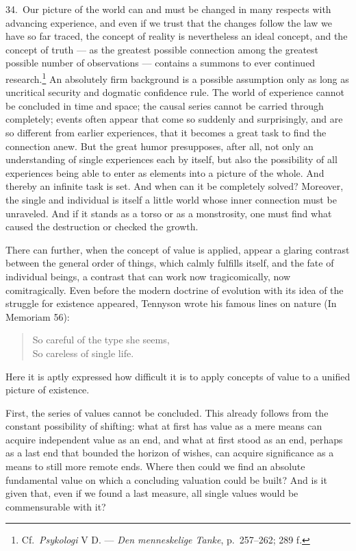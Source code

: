 \documentclass[12pt]{book}
\newcommand{\opage}[1]{\marginnote{\footnotesize\textit{[#1]}}}
\begin{document}
34.~Our picture of the world can and must be changed in many respects with advancing
experience, and even if we trust that the changes follow the law we have so far traced,
the concept of reality is nevertheless an ideal concept, and the concept of truth --- as
the greatest possible connection among the greatest possible number of observations ---
contains a summons to ever continued research.\footnote{Cf.\ \textit{Psykologi} V D. ---
\textit{Den menneskelige Tanke}, p.~257--262; 289 f.} An absolutely firm background is a
possible assumption only \opage{118}as long as uncritical security and dogmatic
confidence rule. The world of experience cannot be concluded in time and space; the causal
series cannot be carried through completely; events often appear that come so suddenly and
surprisingly, and are so different from earlier experiences, that it becomes a great task
to find the connection anew. But the great humor presupposes, after all, not only an
understanding of single experiences each by itself, but also the possibility of all
experiences being able to enter as elements into a picture of the whole. And thereby an
infinite task is set. And when can it be completely solved? Moreover, the single and
individual is itself a little world whose inner connection must be unraveled. And if it
stands as a torso or as a monstrosity, one must find what caused the destruction or
checked the growth.

There can further, when the concept of value is applied, appear a glaring contrast between
the general order of things, which calmly fulfills itself, and the fate of individual
beings, a contrast that can work now tragicomically, now comitragically. Even before the
modern doctrine of evolution with its idea of the struggle for existence appeared, Tennyson
wrote his famous lines on nature (In Memoriam 56):

\begin{quote}
So careful of the type she seems,\\
So careless of single life.
\end{quote}

Here it is aptly expressed how difficult it is to apply concepts of value to a unified
picture of existence.

First, the series of values cannot be concluded. This already follows from the constant
possibility of shifting: what at first has value as a mere means can acquire independent
value as an end, and what at first stood as an end, perhaps as a last end that bounded the
horizon of wishes, can acquire significance as a means to still more remote ends. Where then
could we find an absolute fundamental value on which a concluding valuation could be built?
And is it given that, even if we found a last measure, all single values would be
commensurable with it?
\end{document}
